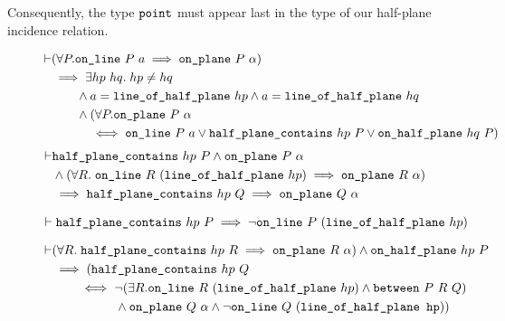 Consequently, the type $\texttt{point}$ must appear last in the type of our half-plane incidence relation.
\begin{figure}
\begin{equation*}
  \begin{split}
    \vdash&(\forall P. \texttt{on\_line}\ P\ a \implies \texttt{on\_plane}\ P\ \alpha)\\
    &\implies \exists hp\ hq.\; hp \neq hq\\
    &\qquad \wedge a = \texttt{line\_of\_half\_plane}\ hp \wedge a = \texttt{line\_of\_half\_plane}\ hq\\
    &\qquad \wedge (\forall P. \texttt{on\_plane}\ P\ \alpha\\
    &\qquad\quad \iff \texttt{on\_line}\ P\ a \vee \texttt{half\_plane\_contains}\ hp\ P \vee \texttt{on\_half\_plane}\ hq\ P)
  \end{split}
\end{equation*}
  \begin{equation}\label{eq:halfPlaneOnPlane}
    \begin{split}
      \vdash&\code{half\_plane\_contains}\ hp\ P \wedge \code{on\_plane}\ P\ \alpha \\
      &\wedge (\forall R.\;\code{on\_line}\ R\ (\code{line\_of\_half\_plane}\ hp) \implies \code{on\_plane}\ R\ \alpha) \\
      &\implies \code{half\_plane\_contains}\ hp\ Q \implies \code{on\_plane}\ Q\ \alpha
    \end{split}
  \end{equation}
  
  \begin{equation}\label{eq:halfPlaneNotOnLine}
    \vdash\texttt{half\_plane\_contains}\ hp\ P \implies \neg\texttt{on\_line}\ P\ (\texttt{line\_of\_half\_plane}\ hp)
  \end{equation}
  
  \begin{equation}\label{eq:onHalfPlaneNotBet}
    \begin{split}
      \vdash&(\forall R.\; \code{half\_plane\_contains}\ hp\ R \implies \code{on\_plane}\ R\ \alpha) \wedge \code{on\_half\_plane}\ hp\ P\\
      &\implies (\code{half\_plane\_contains}\ hp\ Q\\
      &\qquad \iff \neg(\exists R. \code{on\_line}\ R\ (\code{line\_of\_half\_plane}\ hp) \wedge \between{P}{R}{Q})\\
      &\qquad\qquad\quad \wedge \code{on\_plane}\ Q\ \alpha \wedge \neg\code{on\_line}\ Q\ (\code{line\_of\_half\_plane hp}))
    \end{split}
  \end{equation}
  

\end{figure}
